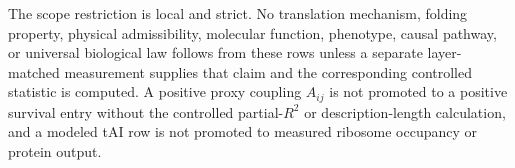 The scope restriction is local and strict.  No translation mechanism, folding property, physical admissibility, molecular function, phenotype, causal pathway, or universal biological law follows from these rows unless a separate layer-matched measurement supplies that claim and the corresponding controlled statistic is computed.  A positive proxy coupling $A_{ij}$ is not promoted to a positive survival entry without the controlled partial-$R^2$ or description-length calculation, and a modeled tAI row is not promoted to measured ribosome occupancy or protein output.
